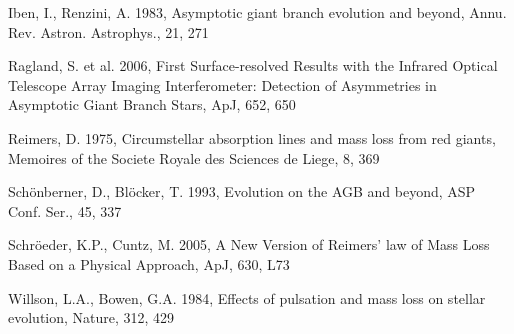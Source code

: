 \documentclass[a4paper,11pt]{article}
\begin{document}
\begin{thebibliography}{9}
    Iben, I., Renzini, A. 1983, Asymptotic giant branch evolution and beyond, Annu. Rev. Astron. Astrophys., 21, 271

    Ragland, S. et al. 2006, First Surface-resolved Results with the Infrared Optical Telescope Array Imaging Interferometer: Detection of Asymmetries in Asymptotic Giant Branch Stars, ApJ, 652, 650



    Reimers, D. 1975, Circumstellar absorption lines and mass loss from red giants, Memoires of the Societe Royale des Sciences de Liege, 8, 369
    
    Schönberner, D., Blöcker, T. 1993, Evolution on the AGB and beyond, ASP Conf. Ser., 45, 337


    Schröeder, K.P., Cuntz, M. 2005, A New Version of Reimers’ law of Mass Loss Based on a Physical Approach, ApJ, 630, L73


    Willson, L.A., Bowen, G.A. 1984, Effects of pulsation and mass loss on stellar evolution, Nature, 312, 429




\end{thebibliography}
\end{document}
